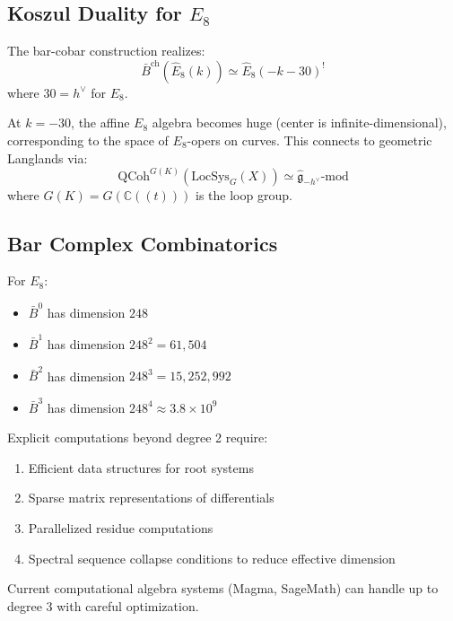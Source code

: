 \subsection{Koszul Duality for $E_8$}

\begin{theorem}
The bar-cobar construction realizes:
$$\bar{B}^{\text{ch}}(\widehat{E}_8(k)) \simeq \widehat{E}_8(-k-30)^!$$
where $30 = h^\vee$ for $E_8$.
\end{theorem}

\begin{corollary}
At $k = -30$, the affine $E_8$ algebra becomes huge (center is infinite-dimensional), corresponding to the space of $E_8$-opers on curves. This connects to geometric Langlands via:
$$\text{QCoh}^{G(K)}(\text{LocSys}_G(X)) \simeq \widehat{\mathfrak{g}}_{-h^\vee}\text{-mod}$$
where $G(K) = G(\mathbb{C}((t)))$ is the loop group.
\end{corollary}

\subsection{Bar Complex Combinatorics}

\begin{remark}
For $E_8$:
\begin{itemize}
\item $\bar{B}^0$ has dimension $248$
\item $\bar{B}^1$ has dimension $248^2 = 61,504$
\item $\bar{B}^2$ has dimension $248^3 = 15,252,992$
\item $\bar{B}^3$ has dimension $248^4 \approx 3.8 \times 10^9$
\end{itemize}

Explicit computations beyond degree 2 require:
\begin{enumerate}
\item Efficient data structures for root systems
\item Sparse matrix representations of differentials
\item Parallelized residue computations
\item Spectral sequence collapse conditions to reduce effective dimension
\end{enumerate}

Current computational algebra systems (Magma, SageMath) can handle up to degree 3 with careful optimization.
\end{remark}

